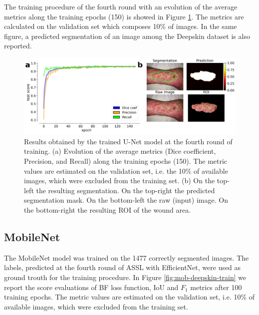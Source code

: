 \documentclass[../main.tex]{subfiles}
\begin{document}
The training procedure of the fourth round with an evolution of the average metrics along the training epochs (150) is showed in Figure \ref{fig:eff-deepskin-train}. The metrics are calculated on the validation set which composes 10\% of images.
In the same figure, a predicted segmentation of an image among the Deepskin dataset is also reported.

\begin{figure}[H] 
\begin{center}
\includegraphics[width=16cm]{images/eff-train-deepskin.png}
\caption{\small{Results obtained by the trained U-Net model at the fourth round of training. (a) Evolution of the average metrics (Dice coefficient, Precision, and Recall) along the training epochs (150). The metric values are estimated on the validation set, i.e. the 10\% of available images, which were excluded from the training set. (b) On the top-left the resulting segmentation. On the top-right the predicted segmentation mask. On the bottom-left the raw (input) image. On the bottom-right the resulting ROI of the wound area.}}\label{fig:eff-deepskin-train}
\end{center}
\end{figure}

\subsection{MobileNet}

The MobileNet model was trained on the 1477 correctly segmented images. The labels, predicted at the fourth round of ASSL with EfficientNet, were used as ground trouth for the training procedure.
In Figure \ref{fig:mob-deepskin-train} we report the score evaluations of BF loss function, IoU and $F_1$ metrics after 100 training epochs. 
The metric values are estimated on the validation set, i.e. 10\% of available images, which were excluded from the training set.
\end{document}
